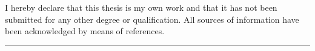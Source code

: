 \begin{frontchapter}[Declaration]
I hereby declare that this thesis is my own work and that it has not been
submitted for any other degree or qualification. All sources of
information have been acknowledged by means of references.

\vspace{1cm}

\noindent\rule{5cm}{0.2pt} \\
\noindent
\theauthor\\
\thesubmissiondate
\end{frontchapter}
